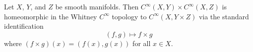 Let $X$, $Y$, and $Z$ be smooth manifolds. Then $C^\infty(X, Y) \times C^\infty(X, Z)$ is homeomorphic in the Whitney $C^\infty$ topology to $C^\infty(X, Y \times Z)$ via the standard identification
$$(f, g) \mapsto f \times g$$
where $(f \times g)(x) = (f(x), g(x))$ for all $x \in X$.
